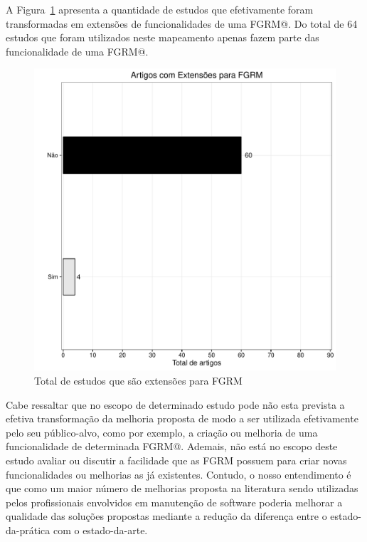 A Figura~\ref{fig:grafico_virou_extensao} apresenta a quantidade de estudos que
efetivamente foram transformadas em extensões de funcionalidades de uma FGRM@.
Do total de 64 estudos que foram utilizados neste mapeamento apenas fazem parte
das funcionalidade de uma FGRM@.

\begin{figure}[htpb] \centering
	\includegraphics[width=0.8\linewidth]{chapter-mapeamento-sistematico/img/grafico_virou_extensao.pdf}
	\caption{Total de estudos que são extensões para FGRM}
	\label{fig:grafico_virou_extensao}
\end{figure}

Cabe ressaltar que no escopo de determinado estudo pode não esta prevista a
efetiva transformação da melhoria proposta de modo a ser utilizada efetivamente
pelo seu público-alvo, como por exemplo, a criação ou melhoria de uma
funcionalidade de determinada FGRM@. Ademais, não está no escopo deste estudo
avaliar ou discutir a facilidade que as FGRM possuem para criar novas
funcionalidades ou melhorias as já existentes. Contudo, o nosso entendimento é
que como um maior número de melhorias proposta na literatura sendo utilizadas
pelos profissionais envolvidos em manutenção de software poderia melhorar a
qualidade das soluções propostas mediante a redução da diferença entre o
estado-da-prática com o estado-da-arte. 



